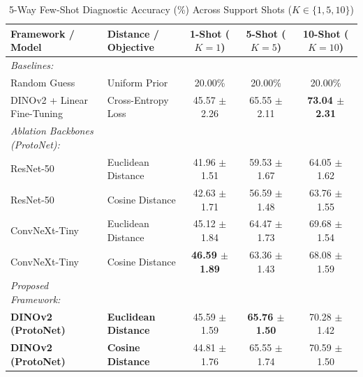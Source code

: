 \documentclass[conference]{IEEEtran}
\begin{document}
\begin{table}[t]
\caption{5-Way Few-Shot Diagnostic Accuracy (\%) Across Support Shots ($K \in \{1, 5, 10\}$)}
\label{tab:fsl_results}
\centering
\begin{tabular}{@{}llccc@{}}
\toprule
\textbf{Framework / Model} & \textbf{Distance / Objective} & \textbf{1-Shot ($K=1$)} & \textbf{5-Shot ($K=5$)} & \textbf{10-Shot ($K=10$)} \\ \midrule
\textit{Baselines:} & & & & \\
Random Guess & Uniform Prior & 20.00\% & 20.00\% & 20.00\% \\
DINOv2 + Linear Fine-Tuning & Cross-Entropy Loss & 45.57 $\pm$ 2.26 & 65.55 $\pm$ 2.11 & \textbf{73.04 $\pm$ 2.31} \\ \midrule
\textit{Ablation Backbones (ProtoNet):} & & & \\
ResNet-50 & Euclidean Distance & 41.96 $\pm$ 1.51 & 59.53 $\pm$ 1.67 & 64.05 $\pm$ 1.62 \\
ResNet-50 & Cosine Distance & 42.63 $\pm$ 1.71 & 56.59 $\pm$ 1.48 & 63.76 $\pm$ 1.55 \\
ConvNeXt-Tiny & Euclidean Distance & 45.12 $\pm$ 1.84 & 64.47 $\pm$ 1.73 & 69.68 $\pm$ 1.54 \\
ConvNeXt-Tiny & Cosine Distance & \textbf{46.59 $\pm$ 1.89} & 63.36 $\pm$ 1.43 & 68.08 $\pm$ 1.59 \\ \midrule
\textit{Proposed Framework:} & & & & \\
\textbf{DINOv2 (ProtoNet)} & \textbf{Euclidean Distance} & 45.59 $\pm$ 1.59 & \textbf{65.76 $\pm$ 1.50} & 70.28 $\pm$ 1.42 \\
\textbf{DINOv2 (ProtoNet)} & \textbf{Cosine Distance} & 44.81 $\pm$ 1.76 & 65.55 $\pm$ 1.74 & 70.59 $\pm$ 1.50 \\ \bottomrule
\end{tabular}
\end{table}
\end{document}
